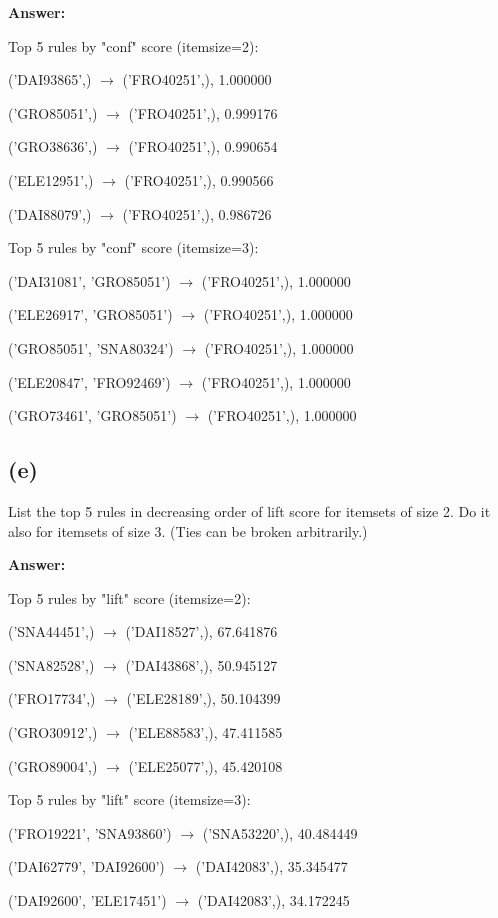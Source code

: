 \documentclass{article}
\begin{document}
\textbf{Answer:}

Top 5 rules by "conf" score (itemsize=2):

('DAI93865',) $\rightarrow$ ('FRO40251',), 1.000000

('GRO85051',) $\rightarrow$ ('FRO40251',), 0.999176

('GRO38636',) $\rightarrow$ ('FRO40251',), 0.990654

('ELE12951',) $\rightarrow$ ('FRO40251',), 0.990566

('DAI88079',) $\rightarrow$ ('FRO40251',), 0.986726


Top 5 rules by "conf" score (itemsize=3):

('DAI31081', 'GRO85051') $\rightarrow$ ('FRO40251',), 1.000000

('ELE26917', 'GRO85051') $\rightarrow$ ('FRO40251',), 1.000000

('GRO85051', 'SNA80324') $\rightarrow$ ('FRO40251',), 1.000000

('ELE20847', 'FRO92469') $\rightarrow$ ('FRO40251',), 1.000000

('GRO73461', 'GRO85051') $\rightarrow$ ('FRO40251',), 1.000000


\subsection{(e)}

List the top 5 rules in decreasing order of lift score for itemsets of size 2. Do it also for
itemsets of size 3. (Ties can be broken arbitrarily.)

\textbf{Answer:}

Top 5 rules by "lift" score (itemsize=2):

('SNA44451',) $\rightarrow$ ('DAI18527',), 67.641876

('SNA82528',) $\rightarrow$ ('DAI43868',), 50.945127

('FRO17734',) $\rightarrow$ ('ELE28189',), 50.104399

('GRO30912',) $\rightarrow$ ('ELE88583',), 47.411585

('GRO89004',) $\rightarrow$ ('ELE25077',), 45.420108


Top 5 rules by "lift" score (itemsize=3):

('FRO19221', 'SNA93860') $\rightarrow$ ('SNA53220',), 40.484449

('DAI62779', 'DAI92600') $\rightarrow$ ('DAI42083',), 35.345477

('DAI92600', 'ELE17451') $\rightarrow$ ('DAI42083',), 34.172245
\end{document}
